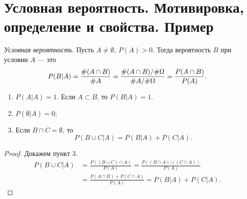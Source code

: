 \section{Условная вероятность. Мотивировка, определение и свойства. Пример}

\begin{definition} \textit{Условная вероятность}. Пусть $A \neq \emptyset, \ P(A) > 0$. Тогда вероятность $B$ при условии $A$ --- это
    $$P(B|A) = \frac{\#(A\cap B)}{\#A} = \frac{\#(A\cap B)/\#\Omega}{\#A/\#\Omega} = \frac{P(A\cap B)}{P(A)}.$$
\end{definition}

\begin{properties}
\enewline
    \begin{enumerate}
        \item $P(A|A) = 1$.
             Если $A \subset B$, то $P(B|A) = 1$.
        \item $P(\emptyset|A) = 0$;
        \item Если $B \cap C = \emptyset$, то
              $$P(B \cup C| A) = P(B|A)+P(C|A).$$
    \end{enumerate}
\end{properties}


\begin{proof} Докажем пункт 3.
\begin{align*}
    P(B\cup C| A) &= \frac{P((B \cup C)\cap A)}{P(A)} = \frac{P((B \cap A)\cup(C \cap A))}{P(A)} \\&= \frac{P(A\cap B)+P(C\cap A)}{P(A)} = P(B|A) + P(C|A).
\end{align*}
    
\end{proof}\newpage

